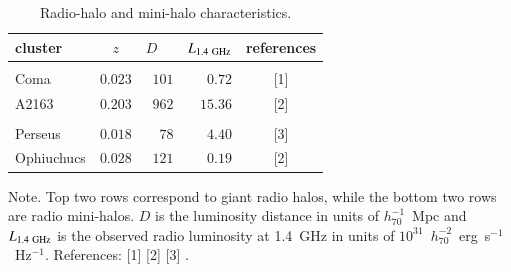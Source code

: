 \documentclass[useAMS,usenatbib]{mn2e}
\begin{document}
\begin{table} 
\begin{center}
\caption{Radio-halo and mini-halo characteristics.}
\medskip
\begin{tabular}{lcrrc}
\hline
\phantom{\Big|}
 cluster & $z$ & $D$~~ & $L_{1.4~{\mathrm{GHz}}}$ & references \\
\hline \\[-0.5em]
Coma           & $0.023$ & $101$ & $0.72$  &  [1]   \\
A2163         & $0.203$ & $962$ & $15.36$  &  [2]  \\
\hline \\[-0.5em]
Perseus        & $0.018$ & $78$   & $4.40$ &  [3]  \\
Ophiuchucs     & $0.028$ & $121$  & $0.19$  &  [2] \\[0.5em]
\hline
\end{tabular}
\label{tab:RadioHalos}
\end{center}
\footnotesize{Note. Top two rows correspond to giant radio halos, while the
  bottom two rows are radio mini-halos.  $D$ is the luminosity distance in units
  of $h_{70}^{-1}$~Mpc and $L_{1.4~{\mathrm{GHz}}}$ is the observed radio luminosity
  at 1.4~GHz in units of $10^{31}$~$h_{70}^{-2}$~erg~s$^{-1}$~Hz$^{-1}$.
  References: [1] \cite{1997A&A...321...55D} [2] \cite{2009A&A...499..679M} [3]
  \cite{1990MNRAS.246..477P}.}
\end{table}
\end{document}
